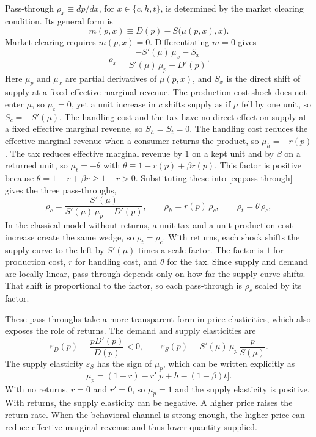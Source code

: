 \documentclass[11pt]{article}
\begin{document}
Pass-through $\rho_x\equiv dp/dx$, for $x\in\{c,h,t\}$, is determined by the
market clearing condition. Its general form is
\begin{equation}
  m(p,x)\equiv D(p)-S\bigl(\mu(p,x),x\bigr).
\end{equation}
Market clearing requires $m(p,x)=0$. Differentiating $m=0$ gives
\begin{equation}
  \rho_x
  =
  \frac{-S'(\mu)\,\mu_{x}-S_x}{S'(\mu)\,\mu_{p}-D'(p)}.
  \label{eq:pass-through}
\end{equation}
Here $\mu_{p}$ and $\mu_{x}$ are partial derivatives of
$\mu(p,x)$, and $S_x$ is the direct shift of supply at a fixed
effective marginal revenue. The production-cost shock does not enter $\mu$, so
$\mu_{c}=0$, yet a unit increase in $c$ shifts supply as if $\mu$
fell by one unit, so $S_c=-S'(\mu)$. The handling cost and the tax have no
direct effect on supply at a fixed effective marginal revenue, so $S_h=S_{t}=0$.
The handling cost reduces the effective marginal revenue when a consumer returns the
product, so $\mu_{h}=-r(p)$. The tax reduces effective marginal revenue by $1$ on a kept unit and by
$\beta$ on a returned unit, so $\mu_{t}=-\theta$ with
$\theta\equiv 1-r(p)+\beta r(p)$. This factor is positive because
$\theta=1-r+\beta r\geq 1-r>0$. Substituting these into
\eqref{eq:pass-through} gives the three pass-throughs,
\begin{equation}
  \rho_c
  = \frac{S'(\mu)}{S'(\mu)\,\mu_{p}-D'(p)},
  \qquad
  \rho_h = r(p)\,\rho_c,
  \qquad
  \rho_{t} = \theta\,\rho_c,
  \label{eq:rho-links}
\end{equation}
In the classical model without returns, a unit tax and a unit
production-cost increase create the same wedge, so
$\rho_{t}=\rho_c$. With returns, each shock shifts the supply curve to the left
by $S'(\mu)$ times a scale factor. The factor is $1$ for production
cost, $r$ for handling cost, and $\theta$ for the tax.
Since supply and demand are locally linear, pass-through depends only
on how far the supply curve shifts. That shift is proportional to the
factor, so each pass-through is $\rho_c$ scaled by its factor.

These pass-throughs take a more transparent form in price
elasticities, which also exposes the role of returns. The demand and supply elasticities are
\[
\varepsilon_D(p)\equiv\frac{p D'(p)}{D(p)}<0,
\qquad
\varepsilon_S(p)\equiv S'(\mu)\,\mu_p\,\frac{p}{S(\mu)}.
\]
The supply elasticity $\varepsilon_S$ has the sign of $\mu_p$, which can be
written explicitly as
\begin{equation}
  \mu_p=(1-r)-r'\bigl[p+h-(1-\beta)t\bigr].
  \label{eq:mu-p}
\end{equation}
With no returns, $r=0$ and $r'=0$, so $\mu_p=1$ and the supply elasticity is positive. With returns,
the supply elasticity can be negative. A higher price raises the return rate.
When the behavioral channel is strong enough, the higher price can reduce
effective marginal revenue and thus lower quantity supplied.
\end{document}
